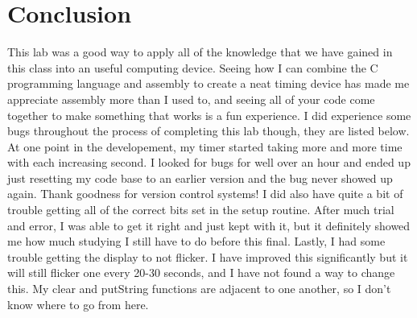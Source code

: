 \documentclass[a4paper,11pt]{article}
\begin{document}
\section{Conclusion}
This lab was a good way to apply all of the knowledge that we have gained in this class into an useful computing device. Seeing how I can combine the C programming language and assembly to create a neat timing device has made me appreciate assembly more than I used to, and seeing all of your code come together to make something that works is a fun experience. I did experience some bugs throughout the process of completing this lab though, they are listed below. \\
At one point in the developement, my timer started taking more and more time with each increasing second. I looked for bugs for well over an hour and ended up just resetting my code base to an earlier version and the bug never showed up again. Thank goodness for version control systems! I did also have quite a bit of trouble getting all of the correct bits set in the setup routine. After much trial and error, I was able to get it right and just kept with it, but it definitely showed me how much studying I still have to do before this final. Lastly, I had some trouble getting the display to not flicker. I have improved this significantly but it will still flicker one every 20-30 seconds, and I have not found a way to change this. My clear and putString functions are adjacent to one another, so I don't know where to go from here.
\end{document}
